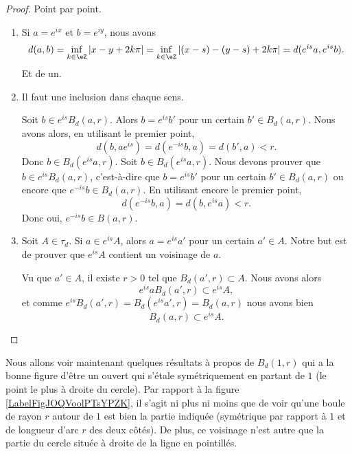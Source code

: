 \begin{proof}
	Point par point.
	\begin{enumerate}
		\item
		      Si \( a= e^{ix}\) et \( b= e^{iy}\), nous avons
		      \begin{equation}
			      d(a,b)=\inf_{k\in \eZ}| x-y+2k\pi |=\inf_{k\in \eZ}| (x-s)-(y-s)+2k\pi |=d( e^{is}a, e^{is}b).
		      \end{equation}
		      Et de un.
		\item
		      Il faut une inclusion dans chaque sens.
		      \begin{subproof}
			      \spitem[\(  e^{is}B_d(a,r)\subset B_d( e^{is}a,r)\)]
			      Soit \( b\in  e^{is}B_d(a,r)\). Alors \( b= e^{is}b'\) pour un certain \( b'\in B_d(a,r)\). Nous avons alors, en utilisant le premier point,
			      \begin{equation}
				      d(b, ae^{is})=d( e^{-is}b,a)=d(b',a)<r.
			      \end{equation}
			      Donc \( b\in B_d( e^{is}a,r)\).
			      \spitem[\(  B_d( e^{is}a,r)\subset e^{is} B_d( a,r)\)]
			      Soit \( b\in B_d( e^{is}a,r)\). Nous devons prouver que \( b\in  e^{is}B_d(a,r)\), c'est-à-dire que \( b= e^{is}b'\) pour un certain \( b'\in B_d(a,r)\) ou encore que \(  e^{-is}b\in B_d(a,r)\). En utilisant encore le premier point,
			      \begin{equation}
				      d( e^{-is}b,a)=d(b, e^{is}a)<r.
			      \end{equation}
			      Donc oui, \(  e^{-is}b\in B(a,r)\).
		      \end{subproof}
		\item
		      Soit \( A\in\tau_d\). Si \( a\in  e^{is}A\), alors \( a= e^{is}a'\) pour un certain \( a'\in A\). Notre but est de prouver que \(  e^{is}A\) contient un voisinage de \( a\).

		      Vu que \( a'\in A\), il existe \( r>0\) tel que \( B_d(a',r)\subset A\). Nous avons alors
		      \begin{equation}
			      e^{is}aB_d(a',r)\subset  e^{is}A,
		      \end{equation}
		      et comme \(  e^{is}B_d(a',r)=B_d( e^{is}a',r)=B_d(a,r)\) nous avons bien
		      \begin{equation}
			      B_d(a,r)\subset  e^{is}A.
		      \end{equation}
	\end{enumerate}
\end{proof}

Nous allons voir maintenant quelques résultats à propos de \(B_d(1,r)\) qui a la bonne figure d'être un ouvert qui s'étale symétriquement en partant de \( 1\) (le point le plus à droite du cercle). Par rapport à la figure \ref{LabelFigJOQVoolPTsYPZK}, il s'agit ni plus ni moins que de voir qu'une boule de rayon \( r\) autour de \( 1\) est bien la partie indiquée (symétrique par rapport à \( 1\) et de longueur d'arc \( r\) des deux côtés). De plus, ce voisinage n'est autre que la partie du cercle située à droite de la ligne en pointillés.
\newcommand{\CaptionFigJOQVoolPTsYPZK}{Un voisinage de \( 1\) dans \( S^1\).}


